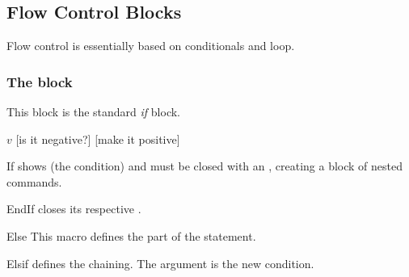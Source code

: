 \documentclass[a4paper, 11pt]{article}
\begin{document}

\subsection{Flow Control Blocks}\label{sec:flow-control-blocks}
Flow control is essentially based on conditionals and loop.

\subsubsection{The  block}
This block is the standard \textit{if} block.

\begin{PDExample}
    \begin{algorithmic}
        \State \Read $v$
        [is it negative?]
            [make it positive]
        \EndIf
    \end{algorithmic}
\end{PDExample}

\begin{Macrodef}{If}{}{}
     shows  (the condition) and must be closed with an , creating a block of nested commands.

    \BlockOptionsText
\end{Macrodef}

\begin{Macrodef}{EndIf}{}{}
     closes its respective .

    \MacroOptionsText
\end{Macrodef}

\begin{Macrodef}{Else}{}{}
    This macro defines the  part of the  statement.

    \BlockOptionsText
\end{Macrodef}

\begin{Macrodef}{Elsif}{}{}
     defines the  chaining. The argument  is the new condition.

    \BlockOptionsText
\end{Macrodef}
\end{document}
